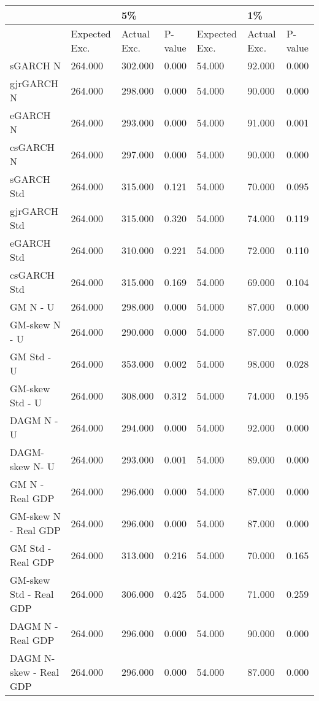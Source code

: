 \documentclass{article}
\begin{document}


\begin{table}[ht]\small
\begin{tabular}{|l|lll|lll|}
\hline
& & 5\% & & & 1\% &\\
  \hline
 & Expected Exc. & Actual Exc. & P-value  & Expected Exc. & Actual Exc. & P-value\\
  \hline
sGARCH N & 264.000 & 302.000 & 0.000 & 54.000 & 92.000 & 0.000 \\
  gjrGARCH N & 264.000 & 298.000 & 0.000 & 54.000 & 90.000 & 0.000 \\
  eGARCH N & 264.000 & 293.000 & 0.000 & 54.000 & 91.000 & 0.001 \\ 
  csGARCH N & 264.000 & 297.000 & 0.000  & 54.000 & 90.000 & 0.000 \\
  sGARCH Std & 264.000 & 315.000 & 0.121  & 54.000 & 70.000 & 0.095 \\ 
  gjrGARCH Std & 264.000 & 315.000 & 0.320   & 54.000 & 74.000 & 0.119 \\ 
  eGARCH Std & 264.000 & 310.000 & 0.221  & 54.000 & 72.000 & 0.110 \\
  csGARCH Std & 264.000 & 315.000 & 0.169   & 54.000 & 69.000 & 0.104 \\ 
  GM N - U & 264.000 & 298.000 & 0.000  & 54.000 & 87.000 & 0.000 \\
  GM-skew N - U & 264.000 & 290.000 & 0.000   & 54.000 & 87.000 & 0.000 \\ 
  GM Std - U & 264.000 & 353.000 & 0.002 & 54.000 & 98.000 & 0.028 \\ 
  GM-skew Std - U & 264.000 & 308.000 & 0.312  & 54.000 & 74.000 & 0.195 \\ 
  DAGM N - U & 264.000 & 294.000 & 0.000 & 54.000 & 92.000 & 0.000 \\ 
  DAGM-skew  N- U & 264.000 & 293.000 & 0.001  & 54.000 & 89.000 & 0.000 \\ 
  GM N - Real GDP & 264.000 & 296.000 & 0.000  & 54.000 & 87.000 & 0.000 \\ 
  GM-skew N - Real GDP & 264.000 & 296.000 & 0.000   & 54.000 & 87.000 & 0.000 \\ 
  GM Std - Real GDP & 264.000 & 313.000 & 0.216  & 54.000 & 70.000 & 0.165 \\
  GM-skew Std - Real GDP & 264.000 & 306.000 & 0.425  & 54.000 & 71.000 & 0.259 \\
  DAGM N - Real GDP & 264.000 & 296.000 & 0.000  & 54.000 & 90.000 & 0.000 \\ 
  DAGM N-skew - Real GDP & 264.000 & 296.000 & 0.000   & 54.000 & 87.000 & 0.000 \\

\end{tabular}
\end{table}
\end{document}
